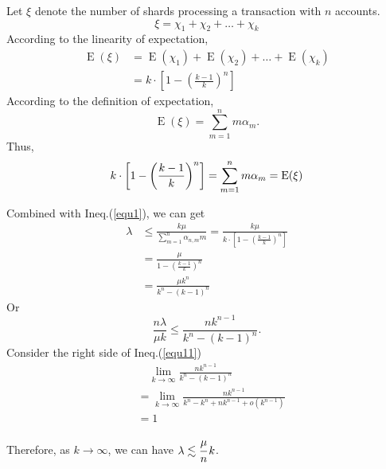 \documentclass[10pt, conference, letterpaper]{IEEEtran}
\begin{document}
Let $\xi$ denote the number of shards processing  a transaction with $n$ accounts.		
\begin{equation}
	\xi= \chi_1+ \chi_2+\dots+ \chi_k
\end{equation}
According to the linearity of expectation,  
\begin{equation}
	\begin{split}
		\operatorname{E}(\xi)&=\operatorname{E}( \chi_1)+\operatorname{E}( \chi_2)+\dots+\operatorname{E}( \chi_k)  \\
		&= k\cdot \left[1-\left(\frac{k-1}{k}\right)^n\right]
	\end{split}
\end{equation}
According to the definition of expectation,
\begin{equation}
	\operatorname{E}(\xi)=\sum_{m=1}^n  m\alpha_{m}.
\end{equation}
Thus, 
\begin{equation}
	k\cdot \left[1-\left(\frac{k-1}{k}\right)^n\right]=\sum_{m=1}^n  m\alpha_{m} = \operatorname{E}(\xi) \\
\end{equation}

Combined with 	Ineq.(\ref{equ1}), we can get 
\begin{equation} \label{equ10}
	\begin{split}
		\lambda&\le\frac{k\mu}{\sum_{m=1}^n  \alpha_{n,m}m } = \frac{k\mu}{k\cdot \left[1-\left(\frac{k-1}{k}\right)^n\right]}\\
		&=\frac{\mu}{1-\left(\frac{k-1}{k}\right)^n}\\
		&=\frac{\mu k^n}{k^n-(k-1)^n}
	\end{split}
\end{equation}
Or
\begin{equation} \label{equ11}
	\frac{n\lambda}{\mu k} \le \frac{n k^{n-1}}{k^n-(k-1)^n}.
\end{equation}
Consider the right side of Ineq.(\ref{equ11})
\begin{equation} \label{equ12}
	\begin{split}
		&\quad \lim_{k\rightarrow \infty} \frac{n k^{n-1}}{k^n-(k-1)^n} \\
		&=\lim_{k\rightarrow \infty}  \frac{n k^{n-1}}{k^n-k^n+n k^{n-1}+o(k^{n-1})} \\
		&= 1
	\end{split}
\end{equation}

Therefore, as $ k \rightarrow \infty$, we can have $\lambda \lesssim \cfrac{\mu}{n}\,k $.
\end{document}
